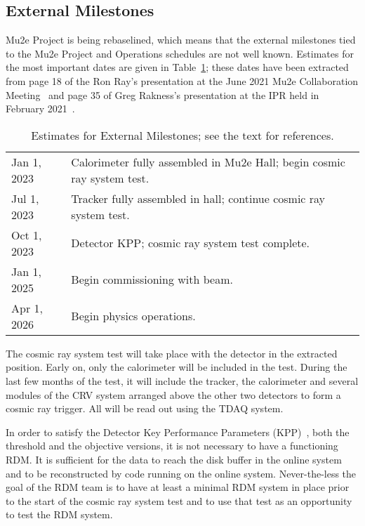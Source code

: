 \subsection{External Milestones}
\label{ssec:ExternalMilestones}

Mu2e Project is being rebaselined, which means that the external milestones tied to the Mu2e
Project and Operations schedules are not well known.
Estimates for the most important dates are given in Table~\ref{tab:externalmilestones};
these dates have been extracted from
page 18 of the Ron Ray's presentation at the June 2021 Mu2e Collaboration Meeting~\cite{ProjectUpdate202106}
and page 35 of Greg Rakness's presentation at the IPR held in February 2021~\cite{OperationsIPR}.

\begin{table}
\begin{center}
\caption[Estimates for External Milestones]{Estimates for External Milestones; see the text for references.}
\label{tab:externalmilestones}
\begin{tabular}{ll}\hline
  Jan 1, 2023 & Calorimeter fully assembled in Mu2e Hall; begin cosmic ray system test. \\
  Jul 1, 2023 & Tracker fully assembled in hall; continue cosmic ray system test. \\
  Oct 1, 2023 & Detector KPP; cosmic ray system test complete. \\
  Jan 1, 2025 & Begin commissioning with beam. \\
  Apr 1, 2026 & Begin physics operations. \\
   \hline
  \end{tabular}
\end{center}
\end{table}


The cosmic ray system test will take place with the detector in the extracted position.
Early on, only the calorimeter will be included in the test.
During the last few months of the test,
it will include the tracker, the calorimeter and several modules of the CRV system
arranged above the other two detectors to form a cosmic ray trigger.
All will be read out using the TDAQ system.



In order to satisfy the Detector Key Performance Parameters (KPP)~\cite{Mu2eKPPs},
both the threshold and the objective versions,
it is not necessary to have a functioning RDM.
It is sufficient for the data to reach the disk buffer in the online system
and to be reconstructed by code running on the online system.
Never-the-less the goal of the RDM team is to have at least a minimal RDM system
in place prior to the start of the cosmic ray system test
and to use that test as an opportunity to test the RDM system.

